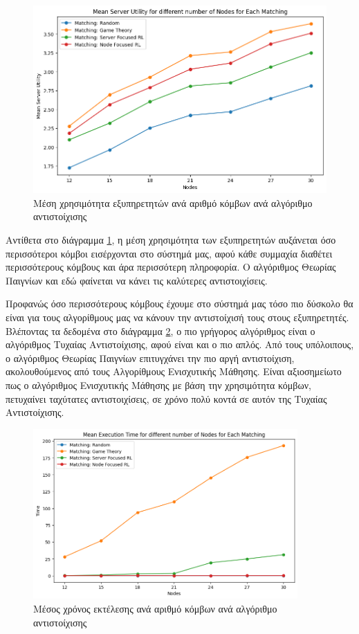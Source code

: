 \begin{figure}[H]
    \centering
    \includegraphics[width=\textwidth]{figures/chapter3/Mean_Server_Utility_vs_Nodes.png}
    \caption{Μέση χρησιμότητα εξυπηρετητών ανά αριθμό κόμβων ανά αλγόριθμο αντιστοίχισης}
    \label{fig10}
\end{figure}

Αντίθετα στο διάγραμμα \ref{fig10}, η μέση χρησιμότητα των εξυπηρετητών αυξάνεται όσο περισσότεροι κόμβοι εισέρχονται στο σύστημά μας, αφού κάθε συμμαχία διαθέτει περισσότερους κόμβους και άρα περισσότερη πληροφορία. Ο αλγόριθμος Θεωρίας Παιγνίων και εδώ φαίνεται να κάνει τις καλύτερες αντιστοιχίσεις.

Προφανώς όσο περισσότερους κόμβους έχουμε στο σύστημά μας τόσο πιο δύσκολο θα είναι για τους αλγορίθμους μας να κάνουν την αντιστοίχισή τους στους εξυπηρετητές. Βλέποντας τα δεδομένα στο διάγραμμα \ref{fig11}, ο πιο γρήγορος αλγόριθμος είναι ο αλγόριθμος Τυχαίας Αντιστοίχισης, αφού είναι και ο πιο απλός. Από τους υπόλοιπους, ο αλγόριθμος Θεωρίας Παιγνίων επιτυγχάνει την πιο αργή αντιστοίχιση, ακολουθούμενος από τους Αλγορίθμους Ενισχυτικής Μάθησης. Είναι αξιοσημείωτο πως ο αλγόριθμος Ενισχυτικής Μάθησης με βάση την χρησιμότητα κόμβων, πετυχαίνει ταχύτατες αντιστοιχίσεις, σε χρόνο πολύ κοντά σε αυτόν της Τυχαίας Αντιστοίχισης.

\newpage

\begin{figure}[ht]
    \centering
    \includegraphics[width=0.9\textwidth]{figures/chapter3/Time_vs_Nodes.png}
    \caption{Μέσος χρόνος εκτέλεσης ανά αριθμό κόμβων ανά αλγόριθμο αντιστοίχισης}
    \label{fig11}
\end{figure}


